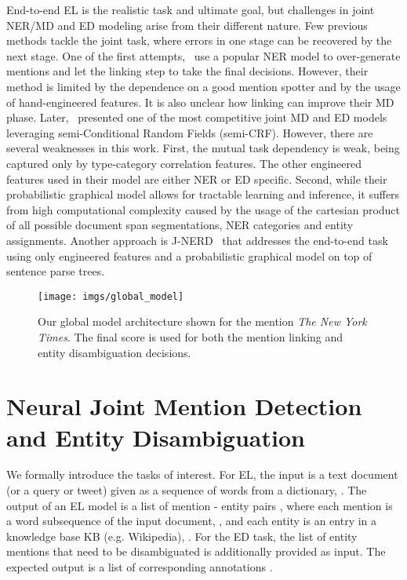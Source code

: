 \documentclass[11pt,a4paper]{article}
\begin{document}
End-to-end EL is the realistic task and ultimate goal, but challenges in joint NER/MD and ED modeling arise from their different nature. Few previous methods tackle the joint task, where errors in one stage can be recovered by the next stage. One of the first attempts,~\citep{sil2013re} use a popular NER model to over-generate mentions and let the linking step to take the final decisions. However, their method is limited by the dependence on a good mention spotter and by the usage of hand-engineered features. It is also unclear how linking can improve their MD phase. Later,~\citep{luo2015joint} presented one of the most competitive joint MD and ED models leveraging semi-Conditional Random Fields (semi-CRF). However, there are several weaknesses in this work. First, the mutual task dependency is weak, being captured only by type-category correlation features. The other engineered features used in their model are either NER or ED specific. Second, while their probabilistic graphical model allows for tractable learning and inference, it suffers from high computational complexity caused by the usage of the cartesian product of all possible document span segmentations, NER categories and entity assignments. Another approach is J-NERD~\citep{nguyen2016j} that addresses the end-to-end task using only engineered features and a probabilistic graphical model on top of sentence parse trees.


 
\begin{figure*}[!htb]
\centering
\texttt{[image: imgs/global\_model]}
\caption{Our global model architecture shown for the mention \textit{The New York Times}. The final score is used for both the mention linking and entity disambiguation decisions.}
\label{fig:model}
\end{figure*}  


\section{Neural Joint Mention Detection and Entity Disambiguation}

We formally introduce the tasks of interest. For EL, the input is a text document (or a query or tweet) given as a sequence  of words from a dictionary, . The output of an EL model is a list of mention - entity pairs , where each mention is a word subsequence of the input document, , and each entity is an entry in a knowledge base KB (e.g. Wikipedia), . For the ED task, the list of entity mentions  that need to be disambiguated is additionally provided as input. The expected output is a list of corresponding annotations . 
\end{document}

